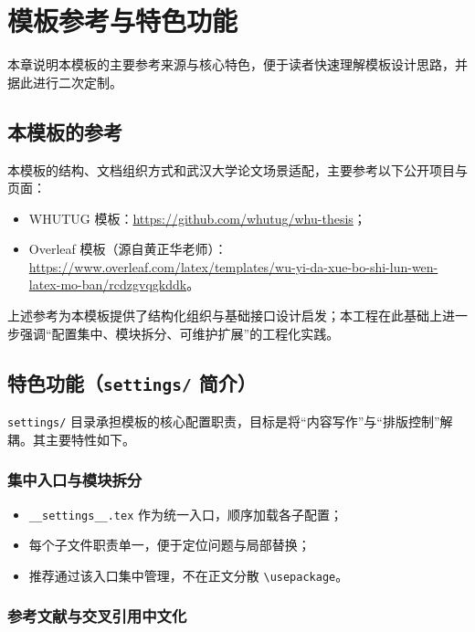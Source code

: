 \chapter{模板参考与特色功能}\label{chap2}

本章说明本模板的主要参考来源与核心特色，便于读者快速理解模板设计思路，并据此进行二次定制。

\section{本模板的参考}\label{sec:reference}

本模板的结构、文档组织方式和武汉大学论文场景适配，主要参考以下公开项目与页面：
\begin{itemize}
  \item WHUTUG 模板：\url{https://github.com/whutug/whu-thesis}；
  \item Overleaf 模板（源自黄正华老师）：\url{https://www.overleaf.com/latex/templates/wu-yi-da-xue-bo-shi-lun-wen-latex-mo-ban/rcdzgvqgkddk}。
\end{itemize}

上述参考为本模板提供了结构化组织与基础接口设计启发；本工程在此基础上进一步强调“配置集中、模块拆分、可维护扩展”的工程化实践。

\section{特色功能（\texttt{settings/} 简介）}

\texttt{settings/} 目录承担模板的核心配置职责，目标是将“内容写作”与“排版控制”解耦。其主要特性如下。

\subsection{集中入口与模块拆分}

\begin{itemize}
  \item \texttt{\_\_settings\_\_.tex} 作为统一入口，顺序加载各子配置；
  \item 每个子文件职责单一，便于定位问题与局部替换；
  \item 推荐通过该入口集中管理，不在正文分散 \texttt{\textbackslash usepackage}。
\end{itemize}

\subsection{参考文献与交叉引用中文化}

